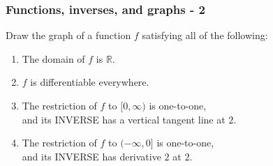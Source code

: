\documentclass[14pt]{beamer}
\newcommand {\DS} [1] {${\displaystyle #1}$}
\newcommand {\R}{\mathbb{R}}
\begin{document}
\begin{frame}[t]
\frametitle{Functions, inverses, and graphs - 2}

Draw the graph of a function $f$ satisfying all of the following:

	\begin{enumerate}
		\item The domain of $f$ is $\R$.
		\item $f$ is differentiable everywhere.
		\item The restriction of $f$ to \DS{[0, \infty)} is one-to-one,  \\ and its INVERSE has a vertical tangent line at $2$.
		\item The restriction of $f$ to \DS{(- \infty,0]} is one-to-one,  \\ and its INVERSE has derivative $2$ at $2$.
	\end{enumerate}

\end{frame}
\end{document}
